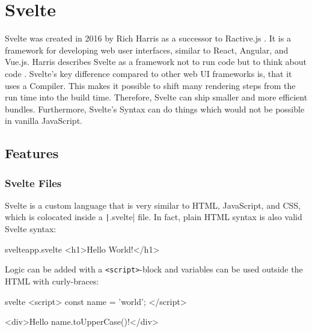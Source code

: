 \section{Svelte}
\label{sec:svelte}

Svelte was created in 2016 by Rich Harris as a successor to Ractive.js \cite{offerzen_origins_svelte_2022}. It is a framework for developing web user interfaces, similar to React, Angular, and Vue.js. Harris describes Svelte as a framework not to run code but to think about code \cite{offerzen_origins_svelte_2022}. Svelte's key difference compared to other web UI frameworks is, that it uses a Compiler. This makes it possible to shift many rendering steps from the run time into the build time. Therefore, Svelte can ship smaller and more efficient bundles. Furthermore, Svelte's Syntax can do things which would not be possible in vanilla JavaScript.

\subsection{Features}


\subsubsection{Svelte Files}

Svelte is a custom language that is very similar to HTML, JavaScript, and CSS, which is colocated inside a \texttt|.svelte| file. In fact, plain HTML syntax is also valid Svelte syntax:

\begin{myminted}{svelte}{app.svelte}
<h1>Hello World!</h1>
\end{myminted}

Logic can be added with a \texttt{<script>}-block and variables can be used outside the HTML with curly-braces:

\begin{myminted}{svelte}{}
<script>
  const name = 'world';
</script>

<div>Hello {name.toUpperCase()}!</div>
\end{myminted}

